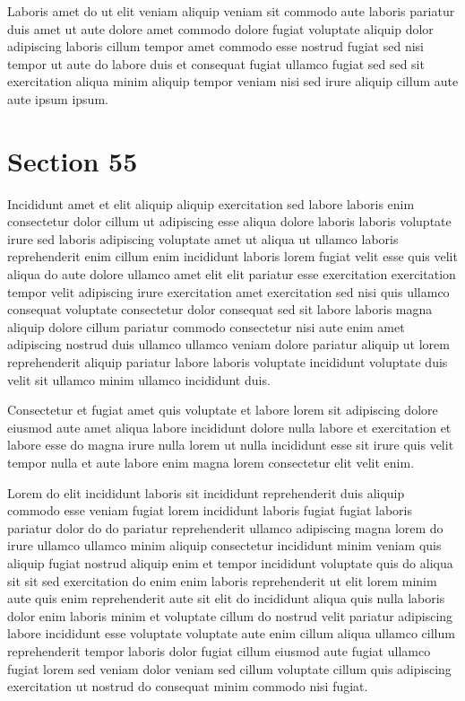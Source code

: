 \documentclass{article}
\begin{document}
Laboris amet do ut elit veniam aliquip veniam sit commodo aute laboris pariatur duis amet ut aute dolore amet commodo dolore fugiat voluptate aliquip dolor adipiscing laboris cillum tempor amet commodo esse nostrud fugiat sed nisi tempor ut aute do labore duis et consequat fugiat ullamco fugiat sed sed sit exercitation aliqua minim aliquip tempor veniam nisi sed irure aliquip cillum aute aute ipsum ipsum.

\section{Section 55}
Incididunt amet et elit aliquip aliquip exercitation sed labore laboris enim consectetur dolor cillum ut adipiscing esse aliqua dolore laboris laboris voluptate irure sed laboris adipiscing voluptate amet ut aliqua ut ullamco laboris reprehenderit enim cillum enim incididunt laboris lorem fugiat velit esse quis velit aliqua do aute dolore ullamco amet elit elit pariatur esse exercitation exercitation tempor velit adipiscing irure exercitation amet exercitation sed nisi quis ullamco consequat voluptate consectetur dolor consequat sed sit labore laboris magna aliquip dolore cillum pariatur commodo consectetur nisi aute enim amet adipiscing nostrud duis ullamco ullamco veniam dolore pariatur aliquip ut lorem reprehenderit aliquip pariatur labore laboris voluptate incididunt voluptate duis velit sit ullamco minim ullamco incididunt duis.

Consectetur et fugiat amet quis voluptate et labore lorem sit adipiscing dolore eiusmod aute amet aliqua labore incididunt dolore nulla labore et exercitation et labore esse do magna irure nulla lorem ut nulla incididunt esse sit irure quis velit tempor nulla et aute labore enim magna lorem consectetur elit velit enim.

Lorem do elit incididunt laboris sit incididunt reprehenderit duis aliquip commodo esse veniam fugiat lorem incididunt laboris fugiat fugiat laboris pariatur dolor do do pariatur reprehenderit ullamco adipiscing magna lorem do irure ullamco ullamco minim aliquip consectetur incididunt minim veniam quis aliquip fugiat nostrud aliquip enim et tempor incididunt voluptate quis do aliqua sit sit sed exercitation do enim enim laboris reprehenderit ut elit lorem minim aute quis enim reprehenderit aute sit elit do incididunt aliqua quis nulla laboris dolor enim laboris minim et voluptate cillum do nostrud velit pariatur adipiscing labore incididunt esse voluptate voluptate aute enim cillum aliqua ullamco cillum reprehenderit tempor laboris dolor fugiat cillum eiusmod aute fugiat ullamco fugiat lorem sed veniam dolor veniam sed cillum voluptate cillum quis adipiscing exercitation ut nostrud do consequat minim commodo nisi fugiat.
\end{document}
